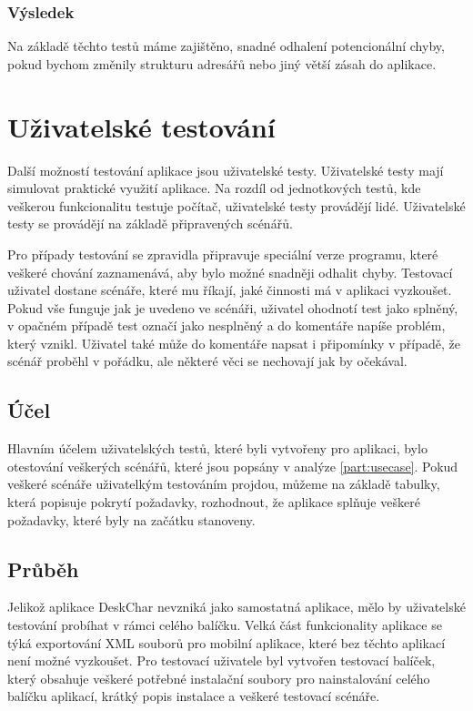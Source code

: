\documentclass[thesis=B,czech]{resources/FITthesis}[2012/06/26]
\begin{document}
			\subsubsection*{Výsledek}
Na základě těchto testů máme zajištěno, snadné odhalení potencionální chyby, pokud bychom změnily strukturu adresářů nebo jiný větší zásah do aplikace.

\section{Uživatelské testování}
Další možností testování aplikace jsou uživatelské testy. Uživatelské testy mají simulovat praktické využití aplikace. Na rozdíl od jednotkových testů, kde veškerou funkcionalitu testuje počítač, uživatelské testy provádějí lidé. Uživatelské testy se provádějí na základě připravených scénářů. \par

Pro případy testování se zpravidla připravuje speciální verze programu, které veškeré chování zaznamenává, aby bylo možné snadněji odhalit chyby. Testovací uživatel dostane scénáře, které mu říkají, jaké činnosti má v aplikaci vyzkoušet. Pokud vše funguje jak je uvedeno ve scénáři, uživatel ohodnotí test jako splněný, v opačném případě test označí jako nesplněný a do komentáře napíše problém, který vznikl. Uživatel také může do komentáře napsat i připomínky v případě, že scénář proběhl v pořádku, ale některé věci se nechovají jak by očekával. 

\subsection{Účel}
Hlavním účelem uživatelských testů, které byli vytvořeny pro aplikaci, bylo otestování veškerých scénářů, které jsou popsány v analýze \ref{part:usecase}. Pokud veškeré scénáře uživatelkým testováním projdou, můžeme na základě tabulky, která popisuje pokrytí požadavky, rozhodnout, že aplikace splňuje veškeré požadavky, které byly na začátku stanoveny. 

\subsection{Průběh}
Jelikož aplikace DeskChar nevzniká jako samostatná aplikace, mělo by uživatelské testování probíhat v rámci celého balíčku. Velká část funkcionality aplikace se týká exportování XML souborů pro mobilní aplikace, které bez těchto aplikací není možné vyzkoušet. Pro testovací uživatele byl vytvořen testovací balíček, který obsahuje veškeré potřebné instalační soubory pro nainstalování celého balíčku aplikací, krátký popis instalace a veškeré testovací scénáře. \par
\end{document}
